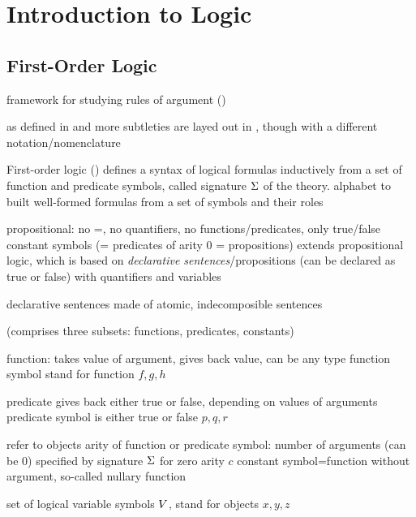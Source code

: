 \chapter{Introduction to Logic}
    \label{sec:introduction-logic}

    \section{First-Order Logic}
        \label{sec:first-order-logic}

        framework for studying rules of argument (\cite{hodges2001ClassicalLogic})

        as defined in \cite{Platzer10HybridSystems} and \cite{Huth04LogicInCS}
        more subtleties are layed out in \cite{hodges2001ClassicalLogic}, though with a different notation/nomenclature


        First-order logic (\FOL) defines a syntax of logical formulas inductively from a set of function and predicate symbols, called signature $\Sigma$ of the theory. alphabet to built well-formed formulas from
        a set of symbols and their roles

        propositional: no =, no quantifiers, no functions/predicates, only true/false constant symbols (= predicates of arity 0 = propositions)
        extends propositional logic, which is based on \textit{declarative sentences}/propositions (can be declared as true or false) with quantifiers
        and variables

        declarative sentences made of atomic, indecomposible sentences

        (comprises three subsets: functions, predicates, constants)

        function: takes value of argument, gives back value, can be any type
        function symbol stand for function
        $f,g,h$

        predicate gives back either true or false, depending on values of arguments
        predicate symbol is either true or false
        $p,q,r$

        refer to objects
        arity of function or predicate symbol: number of arguments (can be 0)
        specified by signature $\Sigma$
        for zero arity $c$ constant symbol=function without argument, so-called nullary function

        set of logical variable symbols $V$, stand for objects
        $x,y,z$

